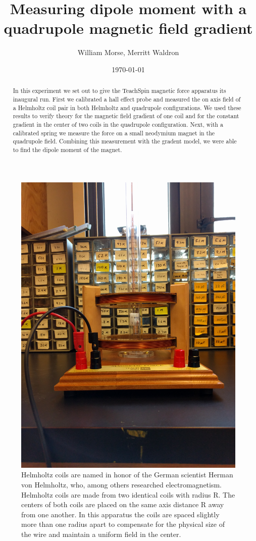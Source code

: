 \documentclass[aps,twocolumn,secnumarabic,balancelastpage,amsmath,amssymb,nofootinbib,floatfix]{revtex4-1}
\begin{document}
\title{Measuring dipole moment with a quadrupole magnetic field gradient}
\author{William Morse, Merritt Waldron}
\date{\today}

\begin{abstract} 
In this experiment we set out to give the TeachSpin magnetic force apparatus its inaugural run. First we calibrated a hall effect probe and measured the on axis field of a Helmholtz coil pair in both Helmholtz and quadrupole configurations. We used these results to verify theory for the magnetic field gradient of one coil and for the constant gradient in the center of two coils in the quadrupole configuration. Next, with a calibrated spring we measure the force on a small neodymium magnet in the quadrupole field. Combining this measurement with the gradent model, we were able to find the dipole moment of the magnet. 
\end{abstract}


\maketitle

\begin{figure}[here]
\includegraphics[width=.47\textwidth]{apparatus}
\caption{Helmholtz coils are named in honor of the German scientist Herman von Helmholtz, who, among others researched electromagnetism. Helmholtz coils are made from two identical coils with radius R. The centers of both coils are placed on the same axis distance R away from one another. In this apparatus the coils are spaced slightly more than one radius apart to compensate for the physical size of the wire and maintain a uniform field in the center.}
\label{apparatus}
\end{figure}
\end{document}
